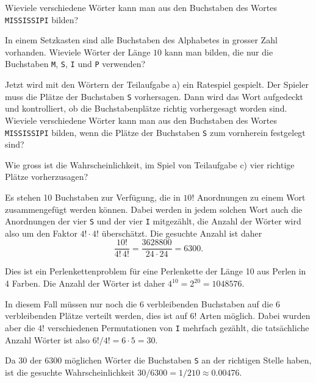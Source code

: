 \begin{teilaufgaben}
\item
Wieviele verschiedene Wörter kann man aus den Buchstaben des
Wortes {\texttt{MISSISSIPI}} bilden?
\item
In einem Setzkasten sind alle Buchstaben des Alphabetes in grosser 
Zahl vorhanden.
Wieviele Wörter der Länge $10$ kann man bilden, die nur die Buchstaben
\texttt{M}, \texttt{S}, \texttt{I} und \texttt{P} verwenden?
\item 
Jetzt wird mit den Wörtern der Teilaufgabe a) ein Ratespiel gespielt.
Der Spieler muss die Plätze der Buchstaben \texttt{S} vorhersagen.
Dann wird das Wort aufgedeckt und kontrolliert, ob die Buchstabenplätze
richtig vorhergesagt worden sind.
Wieviele verschiedene Wörter kann man aus den Buchstaben des Wortes
{\texttt{MISSISSIPI}} bilden, wenn die Plätze der Buchstaben \texttt{S}
zum vornherein festgelegt sind?
\item
Wie gross ist die Wahrscheinlichkeit, im Spiel von Teilaufgabe c)
vier richtige Plätze vorherzusagen?
\end{teilaufgaben}

\begin{loesung}
\begin{teilaufgaben}
\item
Es stehen 10 Buchstaben zur Verfügung, die in $10!$ Anordnungen
zu einem Wort zusammengefügt werden können.
Dabei werden in jedem solchen Wort auch die Anordnungen
der vier \texttt{S} und der vier \texttt{I} mitgezählt, die
Anzahl der Wörter wird also um den Faktor $4!\cdot 4!$ überschätzt.
Die gesuchte Anzahl ist daher
\[
\frac{10!}{4!\,4!} = \frac{3628800}{24\cdot 24}= 6300.
\]
\item
Dies ist ein Perlenkettenproblem für eine Perlenkette der Länge 10
aus Perlen in 4 Farben.
Die Anzahl der Wörter ist daher $4^{10} = 2^{20} = 1048576$.
\item
In diesem Fall müssen nur noch die 6 verbleibenden Buchstaben auf
die 6 verbleibenden Plätze verteilt werden, dies ist auf $6!$ Arten
möglich.
Dabei wurden aber die $4!$ verschiedenen Permutationen von \texttt{I}
mehrfach gezählt, die tatsächliche Anzahl Wörter ist also
$6!/4!=6\cdot 5=30$.
\item
Da $30$ der $6300$ möglichen Wörter die Buchstaben \texttt{S} an der
richtigen Stelle haben, ist die gesuchte Wahrscheinlichkeit 
$30/6300 = 1/210 \approx 0.00476$.
\qedhere
\end{teilaufgaben}
\end{loesung}

